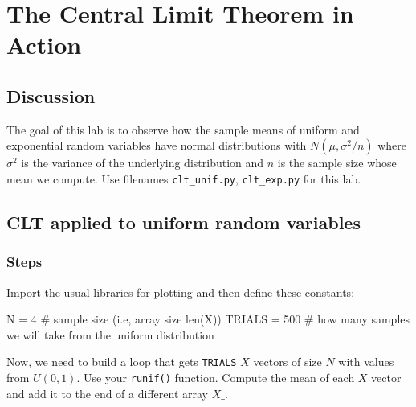 \chapter{The Central Limit Theorem in Action}

\setcounter{problem}{1}

\section{Discussion}

\begin{fullwidth}

The goal of this lab is to observe how the sample means of uniform and exponential random variables have normal distributions with $N(\mu, \sigma^2/n)$ where $\sigma^2$ is the variance of the underlying distribution and $n$ is the sample size whose mean we compute. Use filenames {\tt clt\_unif.py}, {\tt clt\_exp.py} for this lab.

\section{CLT applied to uniform random variables}

\subsection{Steps}


\step Import the usual libraries for plotting and then define these constants:

\begin{pyverbatim}
N = 4  # sample size (i.e, array size len(X))
TRIALS = 500 # how many samples we will take from the uniform distribution
\end{pyverbatim}

\noindent Now, we need to build a loop that gets  {\tt TRIALS} $X$ vectors of size $N$ with values from $U(0,1)$. Use your {\tt runif()} function. Compute the mean of each $X$ vector and add it to the end of a different array $X\_$.


\end{fullwidth}
